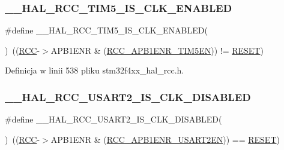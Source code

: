 \subsubsection{\texorpdfstring{\+\_\+\+\_\+\+H\+A\+L\+\_\+\+R\+C\+C\+\_\+\+T\+I\+M5\+\_\+\+I\+S\+\_\+\+C\+L\+K\+\_\+\+E\+N\+A\+B\+L\+ED}{\_\_HAL\_RCC\_TIM5\_IS\_CLK\_ENABLED}}
{\footnotesize\ttfamily \#define \+\_\+\+\_\+\+H\+A\+L\+\_\+\+R\+C\+C\+\_\+\+T\+I\+M5\+\_\+\+I\+S\+\_\+\+C\+L\+K\+\_\+\+E\+N\+A\+B\+L\+ED(\begin{DoxyParamCaption}{ }\end{DoxyParamCaption})~((\hyperlink{group___peripheral__declaration_ga74944438a086975793d26ae48d5882d4}{R\+CC}-\/$>$A\+P\+B1\+E\+NR \& (\hyperlink{group___peripheral___registers___bits___definition_ga49abbbc8fd297c544df2d337b28f80e4}{R\+C\+C\+\_\+\+A\+P\+B1\+E\+N\+R\+\_\+\+T\+I\+M5\+EN})) != \hyperlink{group___exported__types_gga89136caac2e14c55151f527ac02daaffa589b7d94a3d91d145720e2fed0eb3a05}{R\+E\+S\+ET})}



Definicja w linii 538 pliku stm32f4xx\+\_\+hal\+\_\+rcc.\+h.

\mbox{\label{group___r_c_c___a_p_b1___peripheral___clock___enable___disable___status_ga61e4b1f3e82831cdc7508d4c38312eab}} 
\subsubsection{\texorpdfstring{\+\_\+\+\_\+\+H\+A\+L\+\_\+\+R\+C\+C\+\_\+\+U\+S\+A\+R\+T2\+\_\+\+I\+S\+\_\+\+C\+L\+K\+\_\+\+D\+I\+S\+A\+B\+L\+ED}{\_\_HAL\_RCC\_USART2\_IS\_CLK\_DISABLED}}
{\footnotesize\ttfamily \#define \+\_\+\+\_\+\+H\+A\+L\+\_\+\+R\+C\+C\+\_\+\+U\+S\+A\+R\+T2\+\_\+\+I\+S\+\_\+\+C\+L\+K\+\_\+\+D\+I\+S\+A\+B\+L\+ED(\begin{DoxyParamCaption}{ }\end{DoxyParamCaption})~((\hyperlink{group___peripheral__declaration_ga74944438a086975793d26ae48d5882d4}{R\+CC}-\/$>$A\+P\+B1\+E\+NR \& (\hyperlink{group___peripheral___registers___bits___definition_gab840af4f735ec36419d61c7db3cfa00d}{R\+C\+C\+\_\+\+A\+P\+B1\+E\+N\+R\+\_\+\+U\+S\+A\+R\+T2\+EN})) == \hyperlink{group___exported__types_gga89136caac2e14c55151f527ac02daaffa589b7d94a3d91d145720e2fed0eb3a05}{R\+E\+S\+ET})}



